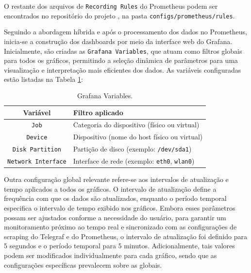 O restante dos arquivos de \verb|Recording Rules| do Prometheus podem ser encontrados no repositório do projeto \citep{vitorcossetti2025}, na pasta \verb|configs/prometheus/rules|.

Seguindo a abordagem híbrida e após o processamento dos dados no Prometheus, inicia-se a construção dos dashboards por meio da interface web do Grafana. Inicialmente, são criadas as \verb|Grafana Variables|, que atuam como filtros globais para todos os gráficos, permitindo a seleção dinâmica de parâmetros para uma visualização e interpretação mais eficientes dos dados. As variáveis configuradas estão listadas na Tabela \ref{tab:grafana-variables}:

\begin{table}[H]
\centering
\caption{Grafana Variables.}
\label{tab:grafana-variables}
\begin{tabular}{cl}
\toprule
\textbf{Variável} & \textbf{Filtro aplicado} \\
\midrule
\verb|Job| & Categoria do dispositivo (físico ou virtual) \\
\verb|Device| & Dispositivo (nome do host físico ou virtual) \\
\verb|Disk Partition| & Partição de disco (exemplo: \verb|/dev/sda1|) \\
\verb|Network Interface| & Interface de rede (exemplo: \verb|eth0|, \verb|wlan0|) \\
\bottomrule
\end{tabular}
\end{table}

Outra configuração global relevante refere-se aos intervalos de atualização e tempo aplicados a todos os gráficos. O intervalo de atualização define a frequência com que os dados são atualizados, enquanto o período temporal especifica o intervalo de tempo exibido nos gráficos. Embora esses parâmetros possam ser ajustados conforme a necessidade do usuário, para garantir um monitoramento próximo ao tempo real e sincronizado com as configurações de scraping do Telegraf e do Prometheus, o intervalo de atualização foi definido para 5 segundos e o período temporal para 5 minutos. Adicionalmente, tais valores podem ser modificados individualmente para cada gráfico, sendo que as configurações específicas prevalecem sobre as globais.

